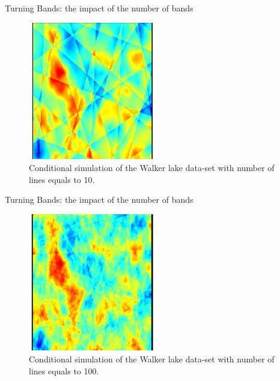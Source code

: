 \begin{frame}{Turning Bands: the impact of the number of bands}
 
\begin{figure}
\begin{center}
\includegraphics[width=0.5\textwidth]{figs/walker_lake_tb_n_10.pdf}
\end{center}
\caption{Conditional simulation of the Walker lake data-set with number of lines equals to 10.}
\label{fig:gaussian_unc_simulation}
\end{figure}
\end{frame}

\begin{frame}{Turning Bands: the impact of the number of bands}
\begin{figure}
\begin{center}
\includegraphics[width=0.5\textwidth]{figs/walker_lake_tb_n_100.pdf}
\end{center}
\caption{Conditional simulation of the Walker lake data-set with number of lines equals to 100.}
\label{fig:gaussian_unc_simulation}
\end{figure}
\end{frame}

